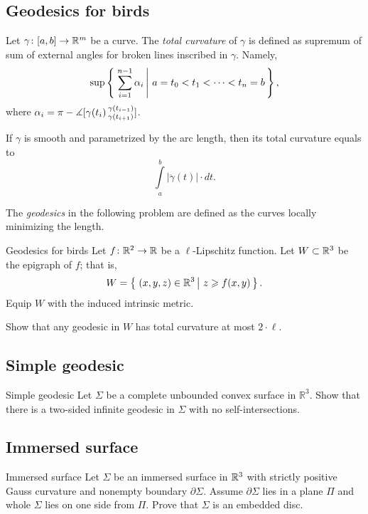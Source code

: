 \subsection*{Geodesics for birds}

Let $\gamma\colon[a,b]\to\mathbb{R}^m$ be a curve.
The \emph{total curvature} of $\gamma$ is defined as supremum of sum of external angles for broken lines inscribed in $\gamma$. 
Namely, 
\[\sup\set{\sum_{i=1}^{n-1}\alpha_i}{a=t_0<t_1<\dots<t_n=b},\]
where $\alpha_i=\pi-\measuredangle [\gamma(t_{i})\,{}^{\gamma(t_{i-1})}_{\gamma(t_{i+1})}]$.

If $\gamma$ is smooth and parametrized by the arc length, 
then its total curvature equals to
\[\int\limits_a^b|\ddot\gamma(t)|\cdot dt.\]

The \emph{geodesics} in the following problem are defined as the curves locally minimizing the length.

\begin{pr}{}{Geodesics for birds}\label{liberman}
Let $f\colon\mathbb{R}^2\to\mathbb{R}$ be a $\ell$-Lipschitz function.
Let $W\subset \mathbb{R}^3$ be the epigraph of $f$;
that is,
$$W=\set{(x,y,z)\in\RR^3}{z\ge f(x,y)}.$$
Equip $W$ with the induced intrinsic metric.

Show that any geodesic in $W$ 
 has  total curvature at most $2\cdot\ell$. 
\end{pr}

\subsection*{Simple geodesic}


\begin{pr}{}{Simple geodesic}\label{Simple geodesic}
Let $\Sigma$ be a complete unbounded convex surface in $\mathbb R^3$.
Show that there is a two-sided infinite geodesic in $\Sigma$ with no self-intersections.
\end{pr}

\subsection*{Immersed surface}
\label{Immersed surface}

\begin{pr}{}{Immersed surface}
Let $\Sigma$ be an immersed surface in $\mathbb{R}^3$ with strictly positive Gauss curvature and nonempty boundary $\partial\Sigma$.
Assume $\partial\Sigma$ lies in a plane $\Pi$
and whole $\Sigma$ lies on one side from $\Pi$.
Prove that $\Sigma$ is an embedded disc.
\end{pr}

